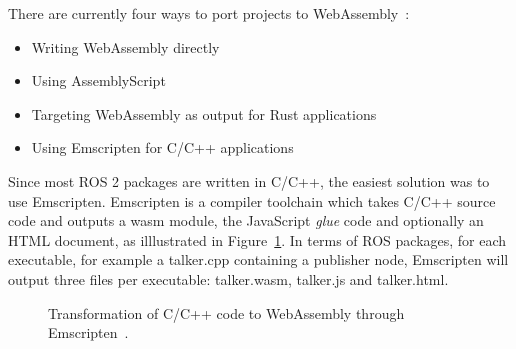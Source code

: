     There are currently four ways to port projects to WebAssembly~\cite{portingwasm}:
    
    \begin{itemize}
        \item Writing WebAssembly directly
        \item Using AssemblyScript
        \item Targeting WebAssembly as output for Rust applications
        \item Using Emscripten for C/C++ applications
    \end{itemize}

    Since most \ac{ROS} 2 packages are written in C/C++, the easiest solution was to use Emscripten. Emscripten is a compiler toolchain which takes C/C++ source code and outputs a wasm module, the JavaScript \textit{glue} code and optionally an HTML document, as illlustrated in Figure~\ref{fig:emscripten}. In terms of \ac{ROS} packages, for each executable, for example a \textsf{talker.cpp} containing a publisher node, Emscripten will output three files per executable: \textsf{talker.wasm}, \textsf{talker.js} and \textsf{talker.html}.

    \begin{figure}[htbp]
        \centering
        \caption{Transformation of C/C++ code to WebAssembly through Emscripten~\cite{portingwasm}.}
        \label{fig:emscripten}
    \end{figure}

